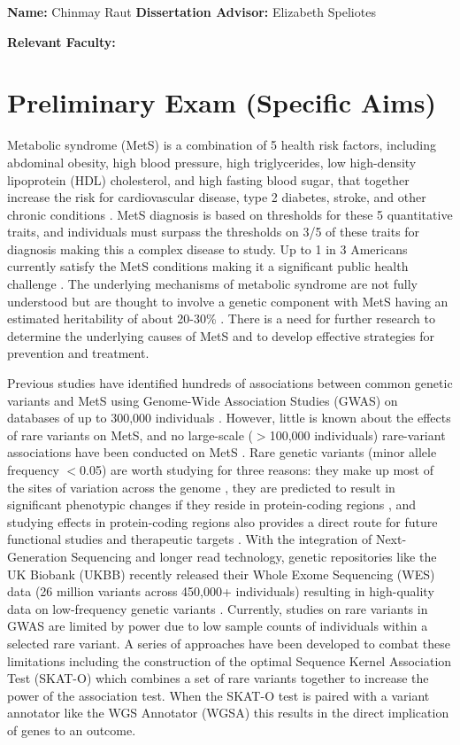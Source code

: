 \documentclass[11pt]{article}
\begin{document}
\noindent
\textbf{Name:} Chinmay Raut \textbf{Dissertation Advisor:} Elizabeth Speliotes

\noindent
\textbf{Relevant Faculty: } 

\section*{Preliminary Exam (Specific Aims)}

Metabolic syndrome (MetS) is a combination of 5 health risk factors, including abdominal obesity, high blood pressure, high triglycerides, low high-density lipoprotein (HDL) cholesterol, and high fasting blood sugar, that together increase the risk for cardiovascular disease, type 2 diabetes, stroke, and other chronic conditions \cite{pmid29480368}. MetS diagnosis is based on thresholds for these 5 quantitative traits, and individuals must surpass the thresholds on 3/5 of these traits for diagnosis making this a complex disease to study. Up to 1 in 3 Americans currently satisfy the MetS conditions making it a significant public health challenge \cite{pmid29480368}. The underlying mechanisms of metabolic syndrome are not fully understood but are thought to involve a genetic component with MetS having an estimated heritability of about 20-30\% \cite{Graziano2019}. There is a need for further research to determine the underlying causes of MetS and to develop effective strategies for prevention and treatment.

Previous studies have identified hundreds of associations between common genetic variants and MetS using Genome-Wide Association Studies (GWAS) on databases of up to 300,000 individuals \cite{pmid31589552}. However, little is known about the effects of rare variants on MetS, and no large-scale ($>$100,000 individuals) rare-variant associations have been conducted on MetS \cite{Lee2018}. Rare genetic variants (minor allele frequency $<$0.05) are worth studying for three reasons: they make up most of the sites of variation across the genome \cite{pmid34662886}, they are predicted to result in significant phenotypic changes if they reside in protein-coding regions \cite{pmid34662886}, and studying effects in protein-coding regions also provides a direct route for future functional studies and therapeutic targets \cite{doi:10.1056/NEJMoa2117872}. With the integration of Next-Generation Sequencing and longer read technology, genetic repositories like the UK Biobank (UKBB) recently released their Whole Exome Sequencing  (WES) data (26 million variants across 450,000+ individuals) resulting in high-quality data on low-frequency genetic variants \cite{pmid34662886}. Currently, studies on rare variants in GWAS are limited by power due to low sample counts of individuals within a selected rare variant. A series of approaches have been developed to combat these limitations including the construction of the optimal Sequence Kernel Association Test (SKAT-O) \cite{pmid22863193} which combines a set of rare variants together to increase the power of the association test. When the SKAT-O test is paired with a variant annotator like the WGS Annotator (WGSA) \cite{pmid26395054} this results in the direct implication of genes to an outcome.
\end{document}
